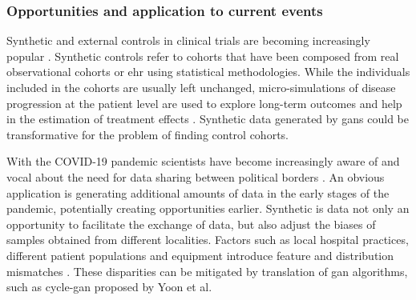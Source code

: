 \subsubsection{Opportunities and application to current events}
Synthetic and external controls in clinical trials are becoming increasingly popular \cite{Thorlund2020}. Synthetic controls refer to cohorts that have been composed from real observational cohorts or \gls{ehr} using statistical methodologies. While the individuals included in the cohorts are usually left unchanged, micro-simulations of disease progression at the patient level are used to explore long-term outcomes and help in the estimation of treatment effects \cite{Thorlund2020, Etzioni2002}. Synthetic data generated by \glspl{gan} could be transformative for the problem of finding control cohorts.\par
With the COVID-19 pandemic scientists have become increasingly aware of and vocal about the need for data sharing between political borders \cite{Cosgriff_2020,Becker_2020,McLennan_2020}. An obvious application is generating additional amounts of data in the early stages of the pandemic, potentially creating opportunities earlier. Synthetic is data not only an opportunity to facilitate the exchange of data, but also adjust the biases of samples obtained from different localities. Factors such as local hospital practices, different patient populations and equipment introduce feature and distribution mismatches \cite{Ghassemi2020}. These disparities can be mitigated by translation of \gls{gan} algorithms, such as \gls{cycle-gan} proposed by Yoon et al.